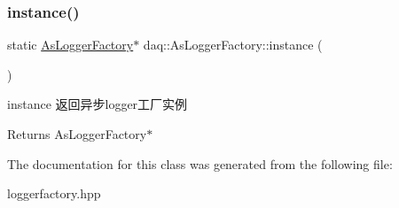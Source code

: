 \subsubsection{\texorpdfstring{instance()}{instance()}}
{\footnotesize\ttfamily static \hyperlink{classdaq_1_1AsLoggerFactory}{As\+Logger\+Factory}$\ast$ daq\+::\+As\+Logger\+Factory\+::instance (\begin{DoxyParamCaption}{ }\end{DoxyParamCaption})\hspace{0.3cm}{\ttfamily [static]}}



instance 返回异步logger工厂实例 

\begin{DoxyReturn}{Returns}
As\+Logger\+Factory$\ast$ 
\end{DoxyReturn}


The documentation for this class was generated from the following file\+:\begin{DoxyCompactItemize}
\item 
loggerfactory.\+hpp\end{DoxyCompactItemize}
